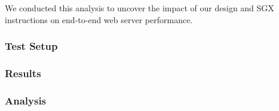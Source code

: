\documentclass[../../../main.tex]{subfiles}
\begin{document}
We conducted this analysis to uncover the impact of our
design and SGX instructions on end-to-end web server performance.

\subsubsection*{Test Setup}
\subsubsection*{Results}
\subsubsection*{Analysis}
\end{document}
